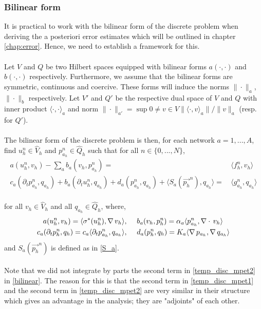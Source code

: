 \subsubsection{Bilinear form} \label{section:num_disc_bilinear}
It is practical to work with the bilinear form of the discrete problem when deriving the a posteriori error estimates which will be outlined in chapter \ref{chap:error}. Hence, we need to establish a framework for this. 
\\
\\
Let $V$ and $Q$ be two Hilbert spaces equipped with bilinear forms $a(\cdot, \cdot)$ and $b(\cdot, \cdot)$ respectively. Furthermore, we assume that the bilinear forms are symmetric, continuous and coercive. These forms will induce the norms $\|\cdot\|_a$, $\|\cdot\|_b$ respectively. Let $V'$ and $Q'$ be the respective dual space of $V$ and $Q$ with inner product $\langle \cdot, \cdot \rangle_a$ and norm $\| \cdot\|_{a'} = \sup{0 \neq v \in V} \|\langle \cdot, v \rangle_a\| / \|v\|_a$ (resp. for $Q'$).  
\\ 
\\
The bilinear form of the discrete problem is then, for each network $a=1,...,A$, find $u_h^n \in \hat{V}_h$ and $p_{a_h}^n \in \hat{Q}_h$ such that for all $n\in\{0,..., N \}$,
\begin{align} \label{bilinear}
a(u_h^n, v_h) - \sum_a b_a(v_h, p_{a_h}^n) = & \, \langle f_h^n, v_h \rangle \\
c_a(\partial_t p_{a_h}^n, q_{a_h}) + b_a( \partial_t u_h^n, q_{a_h}) + d_a(p_{a_h}^n, q_{a_h}) + \langle S_a(\vec{p_h}^n), q_{a_h}\rangle= & \, \langle g_{a_h}^n, q_{a_h} \rangle 
\end{align}
\\
for all $v_h \in \hat{V}_h$ and all $q_{a_h} \in \hat{Q}_h$, where,
\begin{align*}
a(u_h^n, v_h) = \langle \sigma^*(u_h^n), \nabla \, v_h \rangle, \hspace{0.5cm}
& b_a(v_h, p_h^n) =  \alpha_a \langle p_{a_h}^n ,\nabla \cdot \, v_h \rangle \\
c_a(\partial_t p_h^n, q_h) = c_a \langle \partial_t p_{a_h}^{n},  q_{a_h} \rangle, \hspace{0.5cm} 
& d_a(p_h^n, q_h) = K_a \langle \nabla \,p_{a_h}, \nabla\, q_{a_h}\rangle
\end{align*}
and $S_a(\vec{p_h}^n)$ is defined as in \eqref{S_a}. 
\\
\\
Note that we did not integrate by parts the second term in \eqref{temp_disc_mpet2} in \eqref{bilinear}. The reason for this is that the second term in \eqref{temp_disc_mpet1} and the second term in \eqref{temp_disc_mpet2} are very similar in their structure which gives an advantage in the analysis; they are "adjoints" of each other. 
